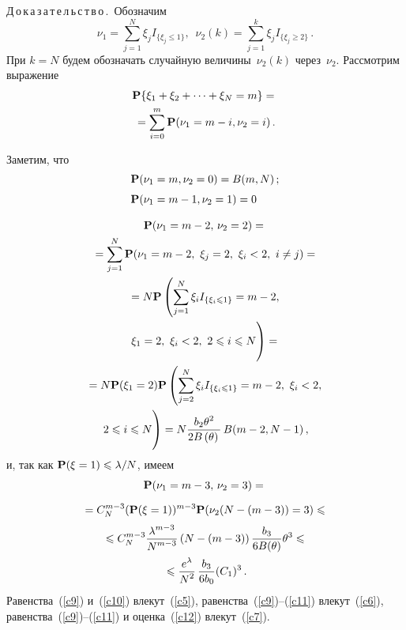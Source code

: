 \begin{multicols}{2}
\medskip

\noindent
Д\,о\,к\,а\,з\,а\,т\,е\,л\,ь\,с\,т\,в\,о\,.\ Обозначим
$$
\nu_1=\sum\limits_{j=1}^N\xi_jI_{\{\xi_j\le
1\}},\,\,\,\nu_2(k)=\sum\limits_{j=1}^k\xi_jI_{\{\xi_j\ge 2\}}\,.
$$
При $k=N$  будем обозначать случайную величины~$\nu_2(k)$ через~$\nu_2$. Рассмотрим выражение
\begin{multline}
{\bf P}\{\xi_1+\xi_2+\dots +\xi_N=m\}={}\\
{}={\sum\limits_{i=0}^m{\bf
P}(\nu_1=m-i, \nu_2=i)}\,.
\label{c9}
\end{multline}

Заметим, что
\begin{align}
{\bf P}(\nu_1&=m, \nu_2=0)=B(m, N)\,;\notag\\[-6pt]
&\label{c10}\\[-6pt]
{\bf P}(\nu_1&=m-1, \nu_2=1)=0 \notag
\end{align}

\vspace*{-6pt}

\noindent
\begin{multline}
{\bf P}(\nu_1=m-2,\,\nu_2=2)={}\\
{}=
\sum\limits_{j=1}^N {\bf P}(\nu_1=m-2,\ \xi_j=2,\ \xi_i<2,\ i\ne j)={}\\
{}=
N{\bf P}\left(\sum_{j=1}^N \xi_iI_{\{\xi_i\le 1\}}=m-2,\right.\\
\left. \xi_1=2,\ \xi_i<2,\ 2\le i\le N \vphantom{\sum_{j=1}^N}
\right)={}\\
{}=
N {\bf P}(\xi_1=2){\bf P}\left(\sum_{j=2}^N\xi_iI_{\{\xi_i\le
1\}}=m-2,\ \xi_i<2,\right.\\
\left.   2\le i\le N \vphantom{\sum_{j=1}^N} \right)=
N\fr{b_2\theta^2}{2B\left(\theta\right)}\,B(m-2, N-1)\,, \label{c11}
\end{multline}
и, так как ${\bf P}(\xi=1)\le \lambda/N$, имеем
\begin{multline}
{\bf P}(\nu_1=m-3,\, \nu_2=3)={}\\[6pt]
{}=
C_N^{m-3}({\bf P}(\xi=1))^{m-3}{\bf P}(\nu_2(N-(m-3))=3)\le{}\\[3pt]
{}\le
C_N^{m-3}\fr{\lambda^{m-3}}{N^{m-3}}\left (N-(m-3)\right)\fr{b_3}{6B(\theta)}\theta^3\le{}\\
{}\le
 \fr{e^{\lambda}}{N^2}\,\fr{b_3}{6b_0}(C_1)^3\,.
\label{c12}
\end{multline}
Равенства~(\ref{c9}) и~(\ref{c10}) влекут~(\ref{c5}), равенства~(\ref{c9})--(\ref{c11}) влекут~(\ref{c6}),
равенства~(\ref{c9})--(\ref{c11}) и оценка~(\ref{c12}) влекут~(\ref{c7}).


\end{multicols}
